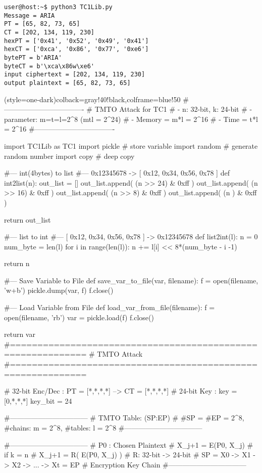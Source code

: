 \begin{lstlisting}[style=terminal]
user@host:~$ python3 TC1Lib.py                            
Message = ARIA
PT = [65, 82, 73, 65]
CT = [202, 134, 119, 230]
hexPT = ['0x41', '0x52', '0x49', '0x41']
hexCT = ['0xca', '0x86', '0x77', '0xe6']
bytePT = b'ARIA'
byteCT = b'\xca\x86w\xe6'
input ciphertext = [202, 134, 119, 230]
output plaintext = [65, 82, 73, 65]
\end{lstlisting}
\newpage
\begin{python}[TC1\_TMTO.py](style=one-dark){colback=gray!40!black,colframe=blue!50}
#----------------------------------
# TMTO Attack for TC1
# - n: 32-bit, k: 24-bit
# - parameter: m=t=l=2^8 (mtl = 2^24)
# - Memory = m*l = 2^16
# - Time   = t*l = 2^16
#----------------------------------

import TC1Lib as TC1
import pickle # store variable
import random # generate random number
import copy   # deep copy 

#--- int(4bytes) to list 
#--- 0x12345678 -> [ 0x12, 0x34, 0x56, 0x78 ]
def int2list(n):
   out_list = []
   out_list.append( (n >> 24) & 0xff )
   out_list.append( (n >> 16) & 0xff )
   out_list.append( (n >>  8) & 0xff )
   out_list.append( (n      ) & 0xff )

   return out_list

#--- list to int
#--- [ 0x12, 0x34, 0x56, 0x78 ] -> 0x12345678
def list2int(l):
   n = 0
   num_byte = len(l)
   for i in range(len(l)):
      n += l[i] << 8*(num_byte - i -1)

   return n

#--- Save Variable to File
def save_var_to_file(var, filename):
   f = open(filename, 'w+b')
   pickle.dump(var, f)
   f.close()

#--- Load Variable from File
   def load_var_from_file(filename):
   f = open(filename, 'rb')
   var = pickle.load(f)
   f.close()
   
   return var
#============================================================
#  TMTO Attack
#============================================================

# 32-bit Enc/Dec : PT = [*,*,*,*] --> CT = [*,*,*,*]
# 24-bit Key     : key = [0,*,*,*]
key_bit = 24

#---------------------------------
# TMTO Table: { (SP:EP) }
#   #SP = #EP = 2^8,   #chains: m = 2^8, #tables: l = 2^8
#---------------------------------

#---------------------------------
# P0 : Chosen Plaintext
# X_{j+1} = E(P0, X_{j}) 		# if k = n
# X_{j+1} = R( E(P0, X_{j}) ) 	   # R: 32-bit -> 24-bit
# SP = X0 -> X1 -> X2 -> ... -> Xt = EP  # Encryption Key Chain
#---------------------------------


\end{python}
